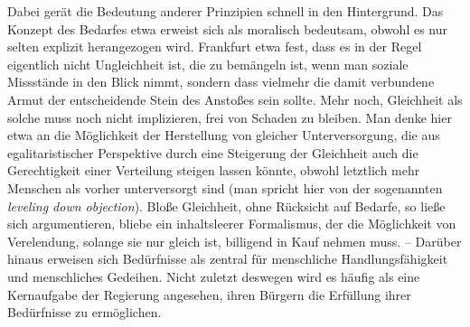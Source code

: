 \documentclass[a4paper]{thesis}
\begin{document}
Dabei gerät die Bedeutung anderer Prinzipien schnell in den Hintergrund. Das Konzept des Bedarfes etwa erweist sich als moralisch bedeutsam, obwohl es nur selten explizit herangezogen wird. Frankfurt etwa fest, dass es in der Regel eigentlich nicht Ungleichheit ist, die zu bemängeln ist, wenn man soziale Missstände in den Blick nimmt, sondern dass vielmehr die damit verbundene Armut der entscheidende Stein des Anstoßes sein sollte. Mehr noch, Gleichheit als solche muss noch nicht implizieren, frei von Schaden zu bleiben. Man denke hier etwa an die Möglichkeit der Herstellung von gleicher Unterversorgung, die aus egalitaristischer Perspektive durch eine Steigerung der Gleichheit auch die Gerechtigkeit einer Verteilung steigen lassen könnte, obwohl letztlich mehr Menschen als vorher unterversorgt sind (man spricht hier von der sogenannten \textit{leveling down objection}). Bloße Gleichheit, ohne Rücksicht auf Bedarfe, so ließe sich argumentieren, bliebe ein inhaltsleerer Formalismus, der die Möglichkeit von Verelendung, solange sie nur gleich ist, billigend in Kauf nehmen muss. -- Darüber hinaus erweisen sich Bedürfnisse als zentral für menschliche Handlungsfähigkeit und menschliches Gedeihen. Nicht zuletzt deswegen wird es häufig als eine Kernaufgabe der Regierung angesehen, ihren Bürgern die Erfüllung ihrer Bedürfnisse zu ermöglichen.
\end{document}
